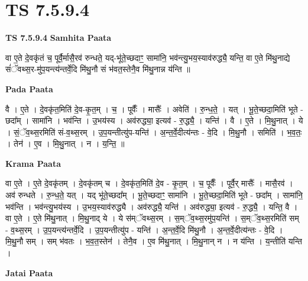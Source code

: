 \documentclass[17pt]{extarticle}
\begin{document}
\section{ TS 7.5.9.4 }

\textbf{TS 7.5.9.4 } \newline
\textbf{Samhita Paata} \newline

वा ए॒ते दे॒वकृ॑तं च॒ पूर्वै॒र्मासै॒रव॑ रुन्धते॒ यद्-भू॑ते॒च्छदाꣳ॒॒ सामा॑नि॒ भव॑न्त्यु॒भय॒स्याव॑रुद्ध्यै॒ यन्ति॒ वा ए॒ते मि॑थु॒नाद्ये सं॑ॅवथ्स॒र-मु॑प॒यन्त्य॑न्तर्वे॒दि मि॑थु॒नौ सं भ॑वत॒स्तेनै॒व मि॑थु॒नान्न य॑न्ति ॥ \newline

\textbf{Pada Paata} \newline

वै । ए॒ते । दे॒वकृ॑त॒मिति॑ दे॒व-कृ॒त॒म् । च॒ । पूर्वैः᳚ । मासैः᳚ । अवेति॑ । रु॒न्ध॒ते॒ । यत् । भू॒ते॒च्छदा॒मिति॑ भूते - छदा᳚म् । सामा॑नि । भव॑न्ति । उ॒भय॑स्य । अव॑रुद्ध्या॒ इत्यव॑ - रु॒द्ध्यै॒ । यन्ति॑ । वै । ए॒ते । मि॒थु॒नात् । ये । सं॒ॅव॒थ्स॒रमिति॑ सं-व॒थ्स॒रम् । उ॒प॒यन्तीत्यु॑प-यन्ति॑ । अ॒न्त॒र्वे॒दीत्य॑न्तः - वे॒दि । मि॒थु॒नौ । समिति॑ । भ॒व॒तः॒ । तेन॑ । ए॒व । मि॒थु॒नात् । न । य॒न्ति॒ ॥  \newline


\textbf{Krama Paata} \newline

वा ए॒ते । ए॒ते दे॒वकृ॑तम् । दे॒वकृ॑तम् च । दे॒वकृ॑त॒मिति॑ दे॒व - कृ॒त॒म् । च॒ पूर्वैः᳚ । पूर्वै॒र् मासैः᳚ । मासै॒रव॑ । अव॑ रुन्धते । रु॒न्ध॒ते॒ यत् । यद् भू॑ते॒च्छदा᳚म् । भू॒ते॒च्छदाꣳ॒॒ सामा॑नि । भू॒ते॒च्छदा॒मिति॑ भूते - छदा᳚म् । सामा॑नि॒ भव॑न्ति । भव॑न्त्यु॒भय॑स्य । उ॒भय॒स्याव॑रुद्ध्यै । अव॑रुद्ध्यै॒ यन्ति॑ । अव॑रुद्ध्या॒ इत्यव॑ - रु॒द्ध्यै॒ । यन्ति॒ वै । वा ए॒ते । ए॒ते मि॑थु॒नात् । मि॒थु॒नाद् ये । ये स॑म्ॅवथ्स॒रम् । स॒म्ॅव॒थ्स॒रमु॑प॒यन्ति॑ । स॒म्ॅव॒थ्स॒रमिति॑ सम् - व॒थ्स॒रम् । उ॒प॒यन्त्य॑न्तर्वे॒दि । उ॒प॒यन्तीत्यु॑प - यन्ति॑ । अ॒न्त॒र्वे॒दि मि॑थु॒नौ । अ॒न्त॒र्वे॒दीत्य॑न्तः - वे॒दि । मि॒थु॒नौ सम् । सम् भ॑वतः । भ॒व॒त॒स्तेन॑ । तेनै॒व । ए॒व मि॑थु॒नात् । मि॒थु॒नान् न । न य॑न्ति । य॒न्तीति॑ यन्ति । \newline

\textbf{Jatai Paata} \newline
\end{document}
